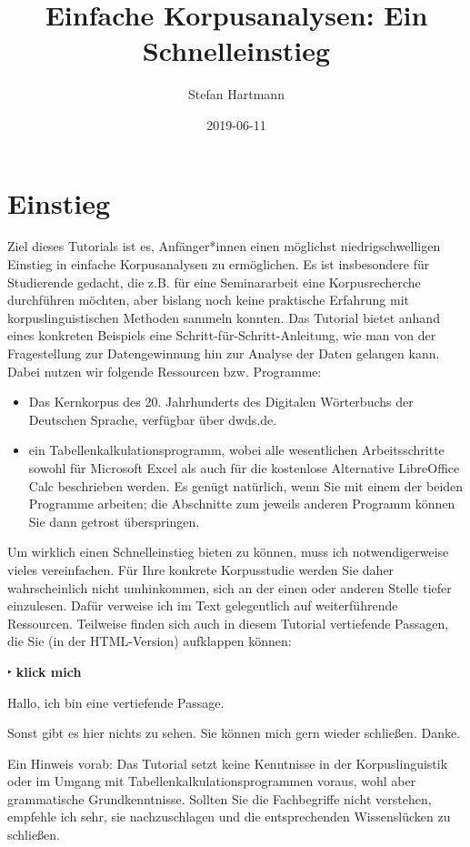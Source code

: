 \documentclass[]{article}
\title{Einfache Korpusanalysen: Ein Schnelleinstieg}
\author{Stefan Hartmann}
\date{2019-06-11}
\begin{document}
\maketitle

{
\setcounter{tocdepth}{4}
\tableofcontents
}
\section{Einstieg}\label{einstieg}

Ziel dieses Tutorials ist es, Anfänger*innen einen möglichst
niedrigschwelligen Einstieg in einfache Korpusanalysen zu ermöglichen.
Es ist insbesondere für Studierende gedacht, die z.B. für eine
Seminararbeit eine Korpusrecherche durchführen möchten, aber bislang
noch keine praktische Erfahrung mit korpuslinguistischen Methoden
sammeln konnten. Das Tutorial bietet anhand eines konkreten Beispiels
eine Schritt-für-Schritt-Anleitung, wie man von der Fragestellung zur
Datengewinnung hin zur Analyse der Daten gelangen kann. Dabei nutzen wir
folgende Ressourcen bzw. Programme:

\begin{itemize}
\item
  Das Kernkorpus des 20. Jahrhunderts des Digitalen Wörterbuchs der
  Deutschen Sprache, verfügbar über dwds.de.
\item
  ein Tabellenkalkulationsprogramm, wobei alle wesentlichen
  Arbeitsschritte sowohl für Microsoft Excel als auch für die kostenlose
  Alternative LibreOffice Calc beschrieben werden. Es genügt natürlich,
  wenn Sie mit einem der beiden Programme arbeiten; die Abschnitte zum
  jeweils anderen Programm können Sie dann getrost überspringen.
\end{itemize}

Um wirklich einen Schnelleinstieg bieten zu können, muss ich
notwendigerweise vieles vereinfachen. Für Ihre konkrete Korpusstudie
werden Sie daher wahrscheinlich nicht umhinkommen, sich an der einen
oder anderen Stelle tiefer einzulesen. Dafür verweise ich im Text
gelegentlich auf weiterführende Ressourcen. Teilweise finden sich auch
in diesem Tutorial vertiefende Passagen, die Sie (in der HTML-Version)
aufklappen können:

 ‣ \textbf{klick mich}

Hallo, ich bin eine vertiefende Passage.

Sonst gibt es hier nichts zu sehen. Sie können mich gern wieder
schließen. Danke.

Ein Hinweis vorab: Das Tutorial setzt keine Kenntnisse in der
Korpuslinguistik oder im Umgang mit Tabellenkalkulationsprogrammen
voraus, wohl aber grammatische Grundkenntnisse. Sollten Sie die
Fachbegriffe nicht verstehen, empfehle ich sehr, sie nachzuschlagen und
die entsprechenden Wissenslücken zu schließen.
\end{document}
